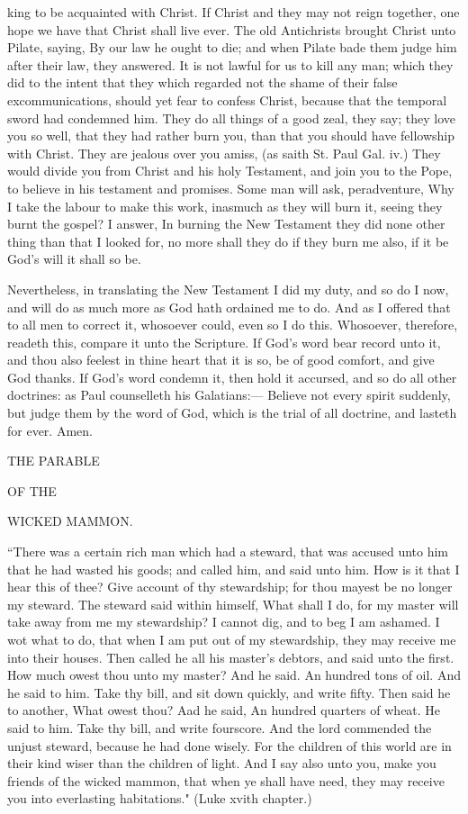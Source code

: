 \documentclass{article}
\begin{document}
king to be acquainted with Christ. If Christ and 
they may not reign together, one hope we have 
that Christ shall live ever. The old Antichrists 
brought Christ unto Pilate, saying, By our law 
he ought to die; and when Pilate bade them 
judge him after their law, they answered. It is 
not lawful for us to kill any man; which they did 
to the intent that they which regarded not the 
shame of their false excommunications, should 
yet fear to confess Christ, because that the
temporal sword had condemned him. They do all 
things of a good zeal, they say; they love you 
so well, that they had rather burn you, than that 
you should have fellowship with Christ. They 
are jealous over you amiss, (as saith St. Paul 
Gal. iv.) They would divide you from Christ and 
his holy Testament, and join you to the Pope, 
to believe in his testament and promises. Some 
man will ask, peradventure, Why I take the 
labour to make this work, inasmuch as they will 
burn it, seeing they burnt the gospel? I answer, 
In burning the New Testament they did none 
other thing than that I looked for, no more shall 
they do if they burn me also, if it be God's will 
it shall so be. 

Nevertheless, in translating the New Testament 
I did my duty, and so do I now, and will do as 
much more as God hath ordained me to do. And 
as I offered that to all men to correct it,
whosoever could, even so I do this. Whosoever, 
therefore, readeth this, compare it unto the 
Scripture. If God's word bear record unto it, 
and thou also feelest in thine heart that it is so, 
be of good comfort, and give God thanks. If 
God's word condemn it, then hold it accursed, 
and so do all other doctrines: as Paul
counselleth his Galatians:— Believe not every spirit 
suddenly, but judge them by the word of God, 
which is the trial of all doctrine, and lasteth for 
ever. Amen. 



THE PARABLE 

OF THE 

WICKED MAMMON. 

``There was a certain rich man which had a steward, that was accused
unto him that he had wasted his goods; and called him, and said unto him. How 
is it that I hear this of thee? Give account of thy stewardship; for thou 
mayest be no longer my steward. The steward said within himself, What shall 
I do, for my master will take away from me my stewardship? I cannot dig, and 
to beg I am ashamed. I wot what to do, that when I am put out of my
stewardship, they may receive me into their houses. Then called he all his master's 
debtors, and said unto the first. How much owest thou unto my master? And 
he said. An hundred tons of oil. And he said to him. Take thy bill, and sit 
down quickly, and write fifty. Then said he to another, What owest thou? 
Aad he said, An hundred quarters of wheat. He said to him. Take thy bill, and 
write fourscore. And the lord commended the unjust steward, because he had 
done wisely. For the children of this world are in their kind wiser than the 
children of light. And I say also unto you, make you friends of the wicked 
mammon, that when ye shall have need, they may receive you into everlasting 
habitations." (Luke xvith chapter.) 
\end{document}
